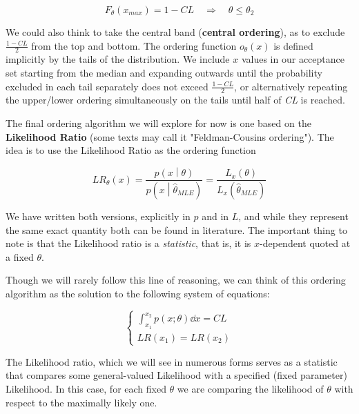 	\[
	F_{\theta}(x_{max}) = 1 - CL \quad \Rightarrow \quad \theta\leq\theta_2
	\]

We could also think to take the central band (\textbf{central ordering}), as to exclude $\frac{1-CL}{2}$ from the top and bottom. The ordering function $o_{\theta}(x)$ is defined implicitly by the tails of the distribution. We include $x$ values in our acceptance set starting from the median and expanding outwards until the probability excluded in each tail separately does not exceed $\frac{1-CL}{2}$, or alternatively repeating the upper/lower ordering simultaneously on the tails until half of \emph{CL} is reached. 

The final ordering algorithm we will explore for now is one based on the \textbf{Likelihood Ratio} (some texts may call it "Feldman-Cousins ordering"). The idea is to use the Likelihood Ratio as the ordering function
	
\begin{equation}
	LR_{\theta}(x) = \frac{p\left(x \middle| \theta\right)}{p\left(x \middle| \hat{\theta}_{MLE}\right)} = \frac{L_{x}\left(\theta\right)}{L_{x}\left(\hat{\theta}_{MLE}\right)}
\label{eq:FC}
\end{equation}

We have written both versions, explicitly in $p$ and in $L$, and while they represent the same exact quantity both can be found in literature. The important thing to note is that the Likelihood ratio is a \emph{statistic}, that is, it is $x$-dependent quoted at a fixed $\theta$.

Though we will rarely follow this line of reasoning, we can think of this ordering algorithm as the solution to the following system of equations:
	
	\[
	\begin{cases}
		\int_{x_1}^{x_2} p(x;\theta)\dd x = CL \\
		LR(x_1) = LR(x_2)
	\end{cases}
	\]

The Likelihood ratio, which we will see in numerous forms serves as a statistic that compares some general-valued Likelihood with a specified (fixed parameter) Likelihood. In this case, for each fixed $\theta$ we are comparing the likelihood of $\theta$ with respect to the maximally likely one.

